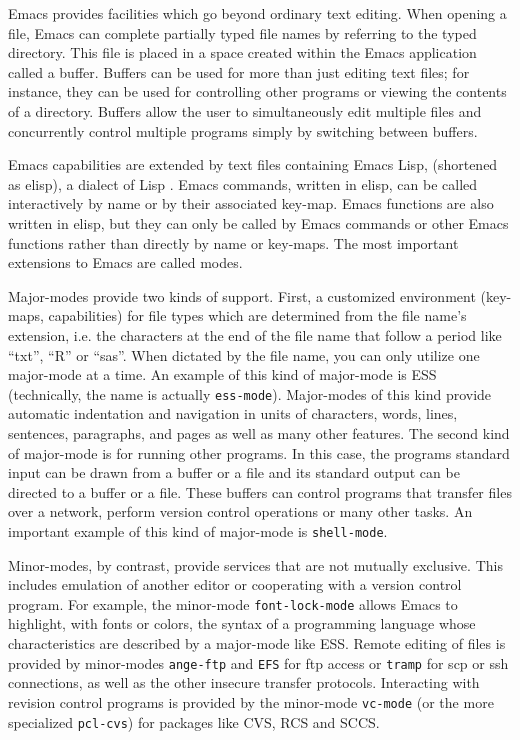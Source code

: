 \documentclass{article}
\newcommand{\stexttt}[1]{{\small\texttt{#1}}}
\begin{document}
Emacs provides facilities which go beyond ordinary text editing.
When opening a file, Emacs can complete partially typed
file names by referring to the typed directory.  This file is placed
in a space created within the Emacs application called a buffer.
Buffers can be used for more than just editing text files; for instance,
they can be used for controlling other programs or viewing the contents of
a directory.  Buffers allow the user to simultaneously edit multiple files
and concurrently control multiple programs simply by switching between buffers.

Emacs capabilities are extended by text files containing Emacs Lisp,
(shortened as elisp), a dialect of Lisp
\citep{RChassell1999,PGraham:1996}.  Emacs commands, written in elisp,
can be called interactively by name or by their associated key-map.
Emacs functions are also written in elisp, but they can only be called
by Emacs commands or other Emacs functions rather than directly by
name or key-maps.  The most important extensions to Emacs are called
modes.

Major-modes provide two kinds of support.
First, a customized environment (key-maps, capabilities) for file
types which are determined from the file name's extension, i.e. the characters
at the end of the file name that follow a period like ``txt'', ``R''
or ``sas''.  When dictated by the file name, you can only utilize one
major-mode at a time.  An example of this kind of major-mode is ESS
(technically, the name is actually \stexttt{ess-mode}).  Major-modes of this
kind provide automatic indentation and navigation in units of characters,
words, lines, sentences, paragraphs, and pages as well as many other
features.  The second kind of major-mode is for running other programs.
In this case, the programs standard input can be drawn from a buffer
or a file and its standard output can be directed to a buffer or a file.
These buffers can control programs that transfer files over a network,
perform version control operations or many other tasks.
An important example of this kind of major-mode is \stexttt{shell-mode}.

Minor-modes, by contrast, provide services that are not mutually
exclusive.  This includes emulation of another editor or cooperating
with a version control program.  For example, the minor-mode
\stexttt{font-lock-mode} allows Emacs to highlight, with fonts or
colors, the syntax of a programming language whose characteristics are
described by a major-mode like ESS.  Remote editing of files is
provided by minor-modes \stexttt{ange-ftp} and \stexttt{EFS} for ftp
access or \stexttt{tramp} for scp or ssh connections, as well as the
other insecure transfer protocols.  Interacting with revision control
programs is provided by the minor-mode \stexttt{vc-mode} (or the more
specialized \stexttt{pcl-cvs}) for packages like CVS, RCS and SCCS.
\end{document}
